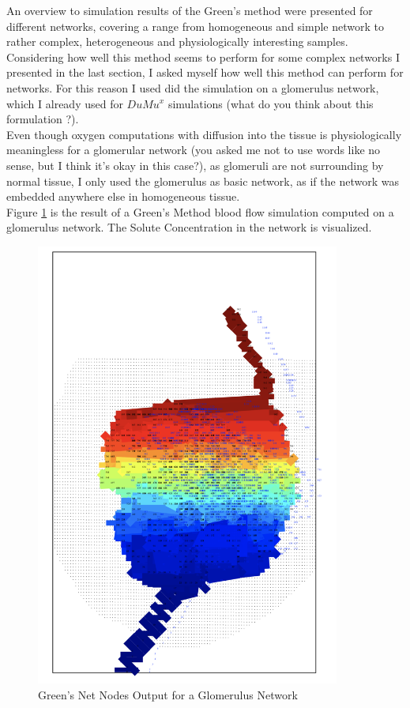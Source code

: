 An overview to simulation results of the Green's method were presented for different networks, covering a range from homogeneous and simple network to rather complex, heterogeneous and physiologically interesting samples.
\\Considering how well this method seems to perform for some complex networks I presented in the last section, I asked myself how well this method can perform for networks. For this reason I used did the simulation on a glomerulus network, which I already used for $DuMu^x$ simulations {\color{red} (what do you think about this formulation ?)}.
\\Even though oxygen computations with diffusion into the tissue is physiologically meaningless for a glomerular network {\color{red} (you asked me not to use words like no sense, but I think it's okay in this case?)}, as glomeruli are not surrounding by normal tissue, I only used the glomerulus as basic network, as if the network was embedded anywhere else in homogeneous tissue.
\\Figure \ref{fig:NetNodesSegs_Glom}  is the result of a Green's Method blood flow simulation computed on a glomerulus network. The Solute Concentration in the network is visualized.\\
\begin{figure}[h]
\centering
\includegraphics[width=100mm]{NetNodesSegs_Glom}
\caption{\footnotesize Green's Net Nodes Output for a Glomerulus Network}
\label{fig:NetNodesSegs_Glom}
\end{figure}
